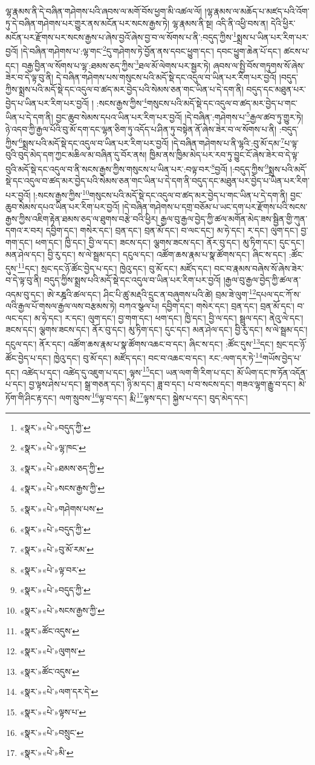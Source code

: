 ལྷ་རྣམས་ནི་དེ་བཞིན་གཤེགས་པའི་ཞབས་ལ་མགོ་བོས་ཕྱག་མི་འཚལ་ལོ། །ལྷ་རྣམས་ལ་མཆོད་པ་མཛད་པའི་འོག་ཏུ་དེ་བཞིན་གཤེགས་པར་གྱུར་ནས་མངོན་པར་སངས་རྒྱས་ཏེ། ལྷ་རྣམས་ནི་སྔ། འདི་ནི་འཕྱི་བས་ན། དེའི་ཕྱིར་མངོན་པར་རྫོགས་པར་སངས་རྒྱས་པ་ཞེས་བྱའོ་ཞེས་བྱ་བ་ལ་སོགས་པ་ནི་:བདུད་ཀྱིས་\footnote{«སྣར་»«པེ་»བདུད་ཀྱི་}སྨྲས་པ་ཡིན་པར་རིག་པར་བྱའོ། །དེ་བཞིན་གཤེགས་པ་:ལྷ་གང་\footnote{«སྣར་»«པེ་»ལྷ་ཁང་}དུ་གཤེགས་ཏེ་བྱོན་ནས་དབང་ཕྱུག་དང་། དབང་ཕྱུག་ཆེན་པོ་དང་། ཚངས་པ་དང་། བརྒྱ་བྱིན་ལ་སོགས་པ་ལྷ་:ཐམས་ཅད་ཀྱིས་\footnote{«སྣར་»«པེ་»ཐམས་ཅད་ཀྱི་}ཐལ་མོ་ལེགས་པར་སྦྱར་ཏེ། ཞབས་ལ་སྤྱི་བོས་གཏུགས་སོ་ཞེས་ཟེར་བ་དེ་ལྟ་བུ་ནི། དེ་བཞིན་གཤེགས་པས་གསུངས་པའི་མདོ་སྡེ་དང་འདུལ་བ་ཡིན་པར་རིག་པར་བྱའོ། །བདུད་ཀྱིས་སྨྲས་པའི་མདོ་སྡེ་དང་འདུལ་བ་ཚད་མར་བྱེད་པའི་སེམས་ཅན་གང་ཡིན་པ་དེ་དག་ནི། བདུད་དང་མཐུན་པར་བྱེད་པ་ཡིན་པར་རིག་པར་བྱའོ། །
:སངས་རྒྱས་ཀྱིས་\footnote{«སྣར་»«པེ་»སངས་རྒྱས་ཀྱི་}གསུངས་པའི་མདོ་སྡེ་དང་འདུལ་བ་ཚད་མར་བྱེད་པ་གང་ཡིན་པ་དེ་དག་ནི། བྱང་ཆུབ་སེམས་དཔའ་ཡིན་པར་རིག་པར་བྱའོ། །དེ་བཞིན་:གཤེགས་པ་\footnote{«སྣར་»«པེ་»གཤེགས་པས་}རྒྱལ་ཚབ་ཏུ་གྱུར་ཏེ། ཉེ་འདབ་ཀྱི་རྒྱལ་པོའི་བུ་མོ་དག་དང་ལྷན་ཅིག་ཏུ་འདོད་པ་ཤིན་ཏུ་བསྟེན་ནོ་ཞེས་ཟེར་བ་ལ་སོགས་པ་ནི། :བདུད་ཀྱིས་\footnote{«སྣར་»«པེ་»བདུད་ཀྱི་}སྨྲས་པའི་མདོ་སྡེ་དང་འདུལ་བ་ཡིན་པར་རིག་པར་བྱའོ། །དེ་བཞིན་གཤེགས་པ་ནི་ལྷའི་:བུ་མོ་དམ་\footnote{«སྣར་»«པེ་»བུ་མོ་རམ་}པ་ལྟ་བུའི་བུད་མེད་དག་ཀྱང་མཆིལ་མ་བཞིན་དུ་བོར་ནས། ཁྱིམ་ནས་ཁྱིམ་མེད་པར་རབ་ཏུ་བྱུང་ངོ་ཞེས་ཟེར་བ་དེ་ལྟ་བུའི་མདོ་སྡེ་དང་འདུལ་བ་ནི་སངས་རྒྱས་ཀྱིས་གསུངས་པ་ཡིན་པར་:བལྟ་བར་\footnote{«སྣར་»«པེ་»ལྟ་བར་}བྱའོ། །:བདུད་ཀྱིས་\footnote{«སྣར་»«པེ་»བདུད་ཀྱི་}སྨྲས་པའི་མདོ་སྡེ་དང་འདུལ་བ་ཚད་མར་བྱེད་པའི་སེམས་ཅན་གང་ཡིན་པ་དེ་དག་ནི་བདུད་དང་མཐུན་པར་བྱེད་པ་ཡིན་པར་རིག་པར་བྱའོ། །:སངས་རྒྱས་ཀྱིས་\footnote{«སྣར་»«པེ་»སངས་རྒྱས་ཀྱི་}གསུངས་པའི་མདོ་སྡེ་དང་འདུལ་བ་ཚད་མར་བྱེད་པ་གང་ཡིན་པ་དེ་དག་ནི། བྱང་ཆུབ་སེམས་དཔའ་ཡིན་པར་རིག་པར་བྱའོ། །དེ་བཞིན་གཤེགས་པ་དགྲ་བཅོམ་པ་ཡང་དག་པར་རྫོགས་པའི་སངས་རྒྱས་ཀྱིས་འཇིག་རྟེན་ཐམས་ཅད་ལ་ཐུགས་བརྩེ་བའི་ཕྱིར། རྒྱལ་བུ་རྒྱལ་བྱེད་ཀྱི་ཚལ་མགོན་མེད་ཟས་སྦྱིན་གྱི་ཀུན་དགའ་ར་བར། དབྱིག་དང་། གསེར་དང་། བྲན་དང་། བྲན་མོ་དང་། བ་ལང་དང་། མ་ཧེ་དང་། ར་དང་། ལུག་དང་། བྱ་གག་དང་། ཕག་དང་། ཁྱི་དང་། བྱི་ལ་དང་། ཟངས་དང་། ལྕགས་ཟངས་དང་། ནོར་བུ་དང་། མུ་ཏིག་དང་། དུང་དང་། མན་ཤེལ་དང་། བྱི་རུ་དང་། ས་ལེ་སྦྲམ་དང་། དངུལ་དང་། འཚོག་ཆས་རྣམ་པ་སྣ་ཚོགས་དང་། ཞིང་ས་དང་། :ཚོང་དུས་\footnote{«སྣར་»ཚོང་འདུས་}དང་། སྲང་དང་ཉོ་ཚོང་བྱེད་པ་དང་། ཁྱེའུ་དང་། བུ་མོ་དང་། མཛོད་དང་། བང་བ་རྣམས་བཞེས་སོ་ཞེས་ཟེར་བ་དེ་ལྟ་བུ་ནི། བདུད་ཀྱིས་སྨྲས་པའི་མདོ་སྡེ་དང་འདུལ་བ་ཡིན་པར་རིག་པར་བྱའོ། །རྒྱལ་བུ་རྒྱལ་བྱེད་ཀྱི་ཚལ་ན་འདམ་བུ་དང་། ཨེ་རཎྜའི་ཚལ་དང་། ཤིང་པི་ཚུ་མརྡའི་དྲུང་ན་བཞུགས་པའི་ཚེ། བྲམ་ཟེ་ལུག་\footnote{«སྣར་»«པེ་»ལུགས་}དཔལ་དང་ཀོ་ས་ལའི་རྒྱལ་པོ་གསལ་རྒྱལ་ལས་བརྩམས་ཏེ། བཀའ་སྩལ་པ། དབྱིག་དང་། གསེར་དང་། བྲན་དང་། བྲན་མོ་དང་། བ་ལང་དང་། མ་ཧེ་དང་། ར་དང་། ལུག་དང་། བྱ་གག་དང་། ཕག་དང་། ཁྱི་དང་། བྱི་ལ་དང་། སྦྲུལ་དང་། ནེའུ་ལེ་དང་། ཟངས་དང་། ལྕགས་ཟངས་དང་། ནོར་བུ་དང་། མུ་ཏིག་དང་། དུང་དང་། མན་ཤེལ་དང་། བྱི་རུ་དང་། ས་ལེ་སྦྲམ་དང་། དངུལ་དང་། ནོར་དང་། འཚོག་ཆས་རྣམ་པ་སྣ་ཚོགས་འཆང་བ་དང་། ཞིང་ས་དང་། :ཚོང་དུས་\footnote{«སྣར་»ཚོང་འདུས་}དང་། སྲང་དང་ཉོ་ཚོང་བྱེད་པ་དང་། ཁྱེའུ་དང་། བུ་མོ་དང་། མཛོད་དང་། བང་བ་འཆང་བ་དང་། རང་:ལག་དར་ཏེ་\footnote{«སྣར་»«པེ་»ལག་དར་དེ་}གཡོས་བྱེད་པ་དང་། འཚེད་པ་དང་། འཚེད་དུ་འཇུག་པ་དང་། ལྟས་\footnote{«སྣར་»«པེ་»ལྟས་པ་}དང་། ཡན་ལག་གི་རིག་པ་དང་། མོ་ཡིག་དང་ཁ་ཏོན་འདོན་པ་དང་། བྱ་ལྟས་ཤེས་པ་དང་། སྒྲ་གཅན་དང་། ཉི་མ་དང་། ཟླ་བ་དང་། པ་བ་སངས་དང་། གཟའ་ལྷག་རྒྱུ་བ་དང་། མེ་ཏོག་གི་ཤིང་རྟ་དང་། ལག་སྲུབས་\footnote{«སྣར་»«པེ་»བསྲུང་}ལྟ་བ་དང་། རྨི་\footnote{«སྣར་»«པེ་»མི་}ལྟས་དང་། སྐྱེས་པ་དང་། བུད་མེད་དང་། 